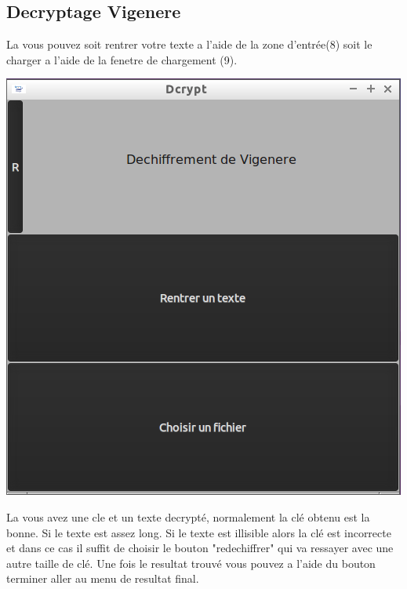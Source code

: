 \documentclass[a4]{article}
\begin{document}
		\subsection{Decryptage Vigenere}
			La vous pouvez soit rentrer votre texte a l'aide de la zone d'entrée(8)
 			soit le charger a l'aide de la fenetre de chargement (9).
			\begin{center}\includegraphics[scale=0.4]{14.png}\end{center}
			La vous avez une cle et un texte decrypté, normalement la clé obtenu est la bonne.
 			Si le texte est assez long. Si le texte est illisible alors la clé est incorrecte et
 			 dans ce cas il suffit de choisir le bouton "redechiffrer" qui va ressayer avec une 
 			 autre taille de clé. Une fois le resultat trouvé vous pouvez a l'aide du bouton 
			 terminer aller au menu de resultat final.  
\end{document}
